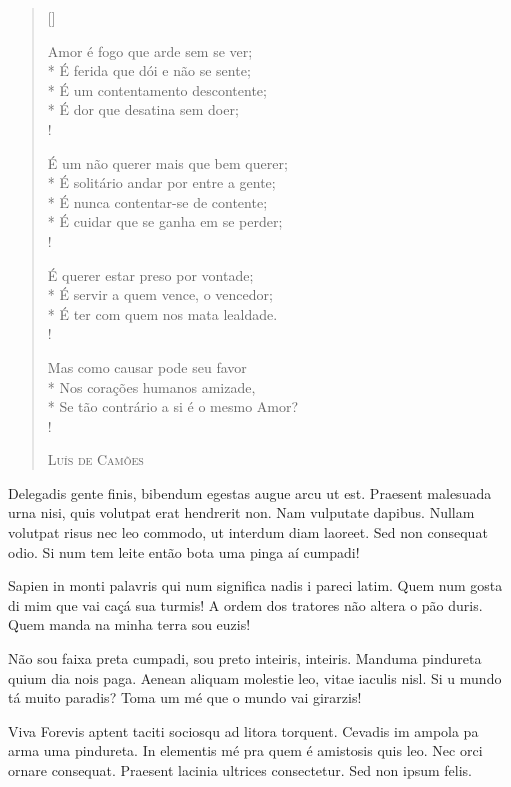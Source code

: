 \settowidth{\versewidth}{É solitário andar por entre a gente;}\label{camoes}
\begin{verse}[\versewidth]
\linenumbers

Amor é fogo que arde sem se ver;\\*
É ferida que dói e não se sente;\\*
É um contentamento descontente;\\*
É dor que desatina sem doer;\\!

É um não querer mais que bem querer;\\*
É solitário andar por entre a gente;\\*
É nunca contentar-se de contente;\\*
É cuidar que se ganha em se perder;\\!

É querer estar preso por vontade;\\*
É servir a quem vence, o vencedor;\\*
É ter com quem nos mata lealdade.\\!

Mas como causar pode seu favor\\*
Nos corações humanos amizade,\\*
Se tão contrário a si é o mesmo Amor?\\!

                 \hfill    \textsc{Luís de Camões}
\end{verse}

\marginnote{\footnotesize \textcolor{green}{Pra lá, depois divoltis porris, paradis. Praesent vel viverra nisi.}}
Delegadis gente finis, bibendum egestas augue arcu ut est. Praesent malesuada
urna nisi, quis volutpat erat hendrerit non. Nam vulputate dapibus. Nullam
volutpat risus nec leo commodo, ut interdum diam laoreet. Sed non consequat
odio. Si num tem leite então bota uma pinga aí cumpadi!

Sapien in monti palavris qui num significa nadis i pareci latim.  Quem num
gosta di mim que vai caçá sua turmis! A ordem dos tratores não altera o pão
duris. Quem manda na minha terra sou euzis!

Não sou faixa preta cumpadi, sou preto inteiris, inteiris. Manduma pindureta
quium dia nois paga. Aenean aliquam molestie leo, vitae iaculis nisl. Si u
mundo tá muito paradis? Toma um mé que o mundo vai girarzis!

Viva Forevis aptent taciti sociosqu ad litora torquent. Cevadis im ampola pa
arma uma pindureta. In elementis mé pra quem é amistosis quis leo. Nec orci
ornare consequat. Praesent lacinia ultrices consectetur. Sed non ipsum felis.
%


